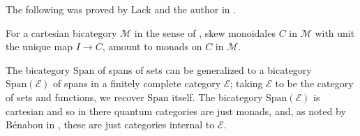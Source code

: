 \documentclass{beamer}
\def\CE{{\mathscr E}}
\def\CM{{\mathscr M}}
\begin{document}
\begin{frame}
The following was proved by Lack and the author in \cite{EckHil}. 

\begin{theorem}
For a cartesian bicategory $\CM$ in the sense of \cite{CBII}, 
skew monoidales $C$ in $\CM$ with unit the unique map $I\to C$, 
amount to monads on $C$ in $\CM$.
\end{theorem}

The bicategory $\mathrm{Span}$ of spans of sets can be generalized to 
a bicategory $\mathrm{Span}(\CE)$ of spans in a finitely complete 
category $\CE$; taking $\CE$ to be the category of sets and functions, 
we recover $\mathrm{Span}$ itself.
The bicategory $\mathrm{Span}(\CE)$ is cartesian and so
in there quantum categories are just monads, 
and, as noted by B\'enabou in \cite{Ben1967}, 
these are just categories internal to $\CE$.
\end{frame}
\end{document}
